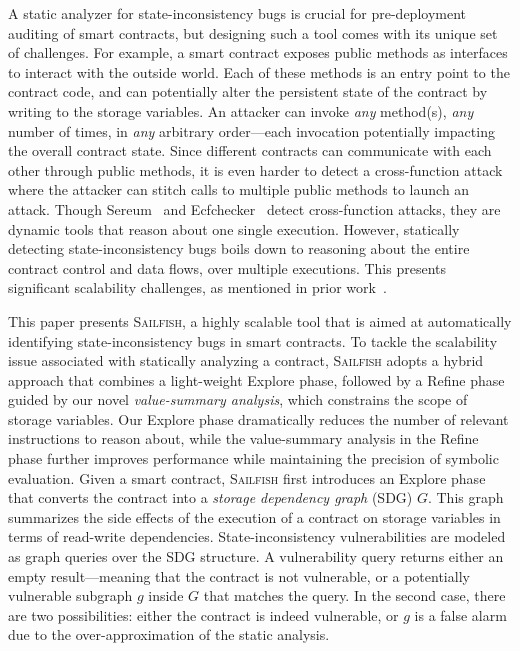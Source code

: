 \documentclass[conference, romanappendices]{tex/IEEEtran}
\theoremstyle{bfnote}
\newcommand{\toolname}{\textsc{Sailfish}\xspace}
\newcommand{\explore}{{\sc Explore}\xspace}
\newcommand{\refine}{{\sc Refine}\xspace}
\newcommand{\sereum}{{\sc Sereum}\xspace}
\newcommand{\ecf}{{\sc Ecfchecker}\xspace}
\newcommand{\smart}{smart contract}
\newcommand{\si}{{state-inconsistency}\xspace}
\newcommand{\vsa}{{value-summary analysis}\xspace}
\newcommand{\sdg}{storage dependency graph\xspace}
\begin{document}
A static analyzer for \si bugs is crucial for pre-deployment auditing of smart contracts, but designing such a tool comes with its unique set of challenges.
For example, a \smart{} exposes public methods as interfaces to interact with the outside world.
Each of these methods is an entry point to the contract code, and can potentially alter the persistent state of the contract by writing to the storage variables.
An attacker can invoke \textit{any} method(s), \textit{any} number of times, in \textit{any} arbitrary order---each invocation potentially impacting the overall contract state.
Since different contracts can communicate with each other through public methods, it is even harder to detect a cross-function attack where the attacker can stitch calls to multiple public methods to launch an attack.
Though \sereum~\cite{sereum} and \ecf~\cite{ecf} detect cross-function attacks, they are dynamic tools that reason about one single execution.
However, statically detecting \si bugs boils down to reasoning about the entire contract control and data flows, over multiple executions.
This presents significant scalability challenges, as mentioned in prior work~\cite{sereum}.


This paper presents \toolname, a highly scalable tool that is aimed at automatically identifying \si bugs in \smart s.
To tackle the scalability issue associated with statically analyzing a contract, \toolname adopts a hybrid approach that combines a light-weight \explore phase, followed by a \refine phase guided by our novel \emph{\vsa}, which constrains the scope of storage variables.
Our \explore phase dramatically reduces the number of relevant instructions to reason about, while the \vsa in the \refine phase further improves performance while maintaining the precision of symbolic evaluation.
Given a smart contract, \toolname first introduces an \explore phase that converts the contract into a \emph{\sdg} (SDG) $G$.
This graph summarizes the side effects of the execution of a contract on storage variables in terms of read-write dependencies.
State-inconsistency vulnerabilities are modeled as graph queries over the SDG structure.
A vulnerability query returns either an empty result---meaning that the contract is not vulnerable, or a potentially vulnerable subgraph $g$ inside $G$ that matches the query.
In the second case, there are two possibilities: either the contract is indeed vulnerable, or $g$ is a false alarm due to the over-approximation of the static analysis. 
\end{document}
